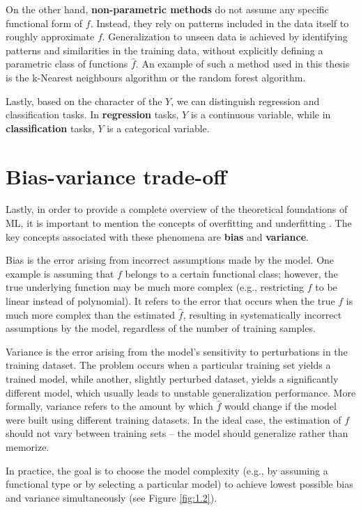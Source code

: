 On the other hand, \textbf{non-parametric methods} do not assume any specific functional form of $f$. Instead, they rely on patterns included in the data itself to roughly approximate $f$. Generalization to unseen data
is achieved by identifying patterns and similarities in the training data, without explicitly defining a parametric class of functions $\hat{f}$. An example of such a method used in this thesis is the k-Nearest neighbours algorithm or the random forest algorithm.

Lastly, based on the character of the $Y$, we can distinguish regression and classification tasks. In \textbf{regression} tasks, $Y$ is a continuous variable, while in \textbf{classification} tasks, $Y$ is a categorical variable.

\section{Bias-variance trade-off}
Lastly, in order to provide a complete overview of the theoretical foundations of ML, it is important to mention the concepts of overfitting and underfitting \cite{skiena}. 
The key concepts associated with these phenomena are \textbf{bias} and \textbf{variance}. 

Bias is the error arising from incorrect assumptions made by the model. 
One example is assuming that $f$ belongs to a certain functional class; however, the true underlying function may be much more complex (e.g., restricting $f$ to be linear instead of polynomial).
It refers to the error that occurs when the true $f$ is much more complex than the estimated $\hat{f}$, resulting in systematically incorrect assumptions by the model, regardless of the number of training samples. 

Variance is the error arising from the model's sensitivity to perturbations in the training dataset. The problem occurs when a particular training set yields a trained model, while another, slightly perturbed dataset,
yields a significantly different model, which usually leads to unstable generalization performance. 
More formally, variance refers to the amount by which $\hat{f}$ would change if the model were built using different training datasets. In the ideal case, the estimation of $f$ should not vary between training sets – the model should generalize rather than memorize.

In practice, the goal is to choose the model complexity (e.g., by assuming a functional type or by selecting a particular model) to achieve lowest possible bias and variance simultaneously (see Figure \ref{fig:1.2}). 

